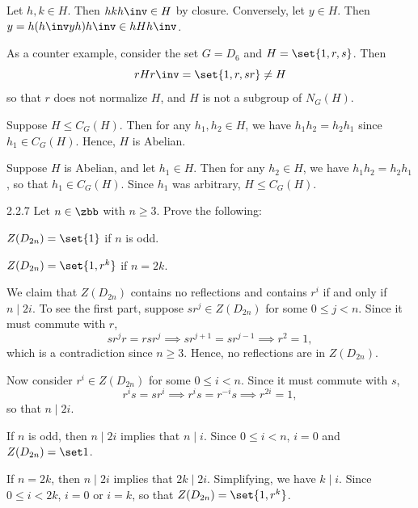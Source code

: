 \begin{solenum}
    \item Let $h, k \in H$.
	Then $hkh\inv \in H$ by closure.
	Conversely, let $y \in H$.
	Then $y = h(h\inv y h)h\inv \in hHh\inv$.
    
    As a counter example, consider the set $G = D_6$ and $H = \set{1, r, s}$.
	Then
    \[
    	rHr\inv = \set{1, r, sr} \neq H
    \]
    so that $r$ does not normalize $H$, and $H$ is not a subgroup of $N_G(H)$.
    \item \rightimp Suppose $H \leq C_G(H)$.
	Then for any $h_1, h_2 \in H$, we have $h_1 h_2 = h_2 h_1$ since $h_1 \in C_G(H)$.
	Hence, $H$ is Abelian.

    \leftimp Suppose $H$ is Abelian, and let $h_1 \in H$.
	Then for any $h_2 \in H$, we have $h_1 h_2 = h_2 h_1$, so that $h_1 \in C_G(H)$.
	Since $h_1$ was arbitrary, $H \leq C_G(H)$. \qedhere
\end{solenum}

\begin{exercise}{2.2.7} 
    Let $n\in\zbb$ with $n\ge 3.$ Prove the following:
    \begin{subexercises}
        \item $Z(D_{2n})=\set{1}$ if $n$ is odd.
        \item $Z(D_{2n})=\set{1,r^k}$ if $n=2k.$
    \end{subexercises}
\end{exercise}

\begin{sol}
    We claim that $Z(D_{2n})$ contains no reflections and contains $r^i$ if and only if $n \mid 2i$.
	To see the first part, suppose $sr^j \in Z(D_{2n})$ for some $0 \leq j < n$.
	Since it must commute with $r$,
    \[
    	sr^j r = r sr^j \implies sr^{j + 1} = sr^{j - 1} \implies r^2 = 1,
    \]
    which is a contradiction since $n \geq 3$.
	Hence, no reflections are in $Z(D_{2n})$.

    Now consider $r^i \in Z(D_{2n})$ for some $0 \leq i < n$.
	Since it must commute with $s$,
    \[
    	r^i s = s r^i \implies r^is = r^{-i} s \implies r^{2i} = 1,
    \]
    so that $n \mid 2i$.
    \begin{subexercises}
        \item If $n$ is odd, then $n \mid 2i$ implies that $n \mid i$.
	    Since $0 \leq i < n$, $i = 0$ and $Z(D_{2n}) = \set 1$.
        \item If $n = 2k$, then $n \mid 2i$ implies that $2k \mid 2i$.
	    Simplifying, we have $k \mid i$.
	    Since $0 \leq i < 2k$, $i = 0$ or $i = k$, so that $Z(D_{2n}) = \set{1, r^k}$. \qedhere
    \end{subexercises}
\end{sol}

